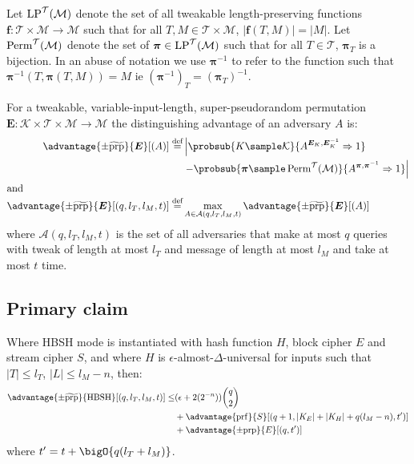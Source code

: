 \documentclass[eprint.tex]{subfiles}
\begin{document}
Let $\operatorname{LP}^\mathcal{T}(\mathcal{M})$ denote the set of all
tweakable length-preserving functions
$\bm{f} : \mathcal{T} \times \mathcal{M} \rightarrow \mathcal{M}$
such that for all $T, M \in \mathcal{T} \times \mathcal{M}$,
$|\bm{f}(T, M)| = |M|$. Let $\operatorname{Perm}^\mathcal{T}(\mathcal{M})$ denote
the set of $\bm{\pi} \in \operatorname{LP}^\mathcal{T}(\mathcal{M})$ such that
for all $T \in \mathcal{T}$, $\bm{\pi}_{T}$ is a bijection.
In an abuse of notation
we use $\bm{\pi}^{-1}$ to refer to the function
such that $\bm{\pi}^{-1}(T, \bm{\pi}(T, M)) = M$ ie $(\bm{\pi}^{-1})_T = (\bm{\pi}_T)^{-1}$.

For a tweakable, variable-input-length, super-pseudorandom permutation
$\bm{E} : \mathcal{K} \times \mathcal{T} \times \mathcal{M} \rightarrow \mathcal{M}$
the distinguishing advantage of an adversary $A$ is:
%
\begin{align*}
    \advantage{\pm \widetilde{\mathrm{prp}}}{\bm{E}}[(A)] \defeq
    &\left|\probsub{K \sample \mathcal{K}}{A^{\bm{E}_K,\bm{E}_K^{-1}}\Rightarrow 1}\right.
    \\
    &\left. - \probsub{\bm{\pi} \sample \Perm^\mathcal{T}(\mathcal{M})}
        {A^{\bm{\pi},\bm{\pi}^{-1}}\Rightarrow 1}\right|
    \\
    \intertext{and}
    \advantage{\pm \widetilde{\mathrm{prp}}}{\bm{E}}[(q, l_T, l_M, t)]
    \defeq &
    \max_{A \in \mathcal{A}(q, l_T, l_M, t)} \advantage{\pm \widetilde{\mathrm{prp}}}{\bm{E}}[(A)]
\end{align*}
%
\begin{displaymath}
\end{displaymath}
where $\mathcal{A}(q, l_T, l_M, t)$
is the set of all adversaries that
make at most $q$ queries
with tweak of length at most $l_T$
and message of length at most $l_M$
and take at most $t$ time.

\subsection{Primary claim}
\begin{theorem}\label{hbshadvantage}
    Where HBSH mode is instantiated with hash function $H$, block cipher $E$ and stream cipher $S$,
    and where $H$ is $\epsilon$-almost-$\Delta$-universal for inputs such that
    $|T| \leq l_T$, $|L| \leq l_M - n$, then:
    \begin{align*}
        \advantage{\pm \widetilde{\mathrm{prp}}}{\HBSH}[(q, l_T, l_M, t)]
        \leq &(\epsilon + 2(2^{-n}))\binom{q}{2} \\
        &+ \advantage{\mathrm{prf}}{S}[(q + 1, |K_E| + |K_H| + q(l_M - n), t')] \\
        &+ \advantage{\pm \mathrm{prp}}{E}[(q, t')]\\
    \end{align*}
    where $t' = t + \bigO{q(l_T + l_M)}$.
\end{theorem}
\end{document}
